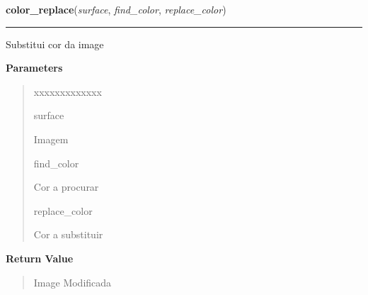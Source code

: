     \label{pygame-asteroids:color:Color:color_replace}

    \vspace{0.5ex}

\hspace{.8\funcindent}\begin{boxedminipage}{\funcwidth}

    \raggedright \textbf{color\_replace}(\textit{surface}, \textit{find\_color}, \textit{replace\_color})

    \vspace{-1.5ex}

    \rule{\textwidth}{0.5\fboxrule}
\setlength{\parskip}{2ex}
    Substitui cor da image

\setlength{\parskip}{1ex}
      \textbf{Parameters}
      \vspace{-1ex}

      \begin{quote}
        \begin{Ventry}{xxxxxxxxxxxxx}

          \item[surface]

          Imagem

          \item[find\_color]

          Cor a procurar

          \item[replace\_color]

          Cor a substituir

        \end{Ventry}

      \end{quote}

      \textbf{Return Value}
    \vspace{-1ex}

      \begin{quote}
      Image Modificada

      \end{quote}

    \end{boxedminipage}



